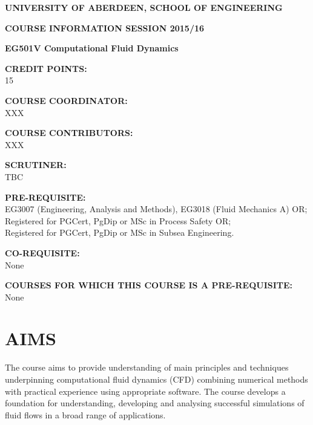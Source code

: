 \documentclass[12pts,a4paper,amsmath,amssymb,floatfix]{article}%
\begin{document}
\begin{center}
{\large {\bf UNIVERSITY OF ABERDEEN, SCHOOL OF ENGINEERING}}
\medskip

{\large {\bf COURSE INFORMATION SESSION 2015/16}}
\bigskip 

{\Large {\bf EG501V Computational Fluid Dynamics}}
\end{center}

\bigskip
\begin{flushleft}

{\large {\bf CREDIT POINTS:}}\\
\hspace{0.8cm} 15
\medskip

{\large {\bf COURSE COORDINATOR: }}\\
\hspace{0.8cm} XXX %
\medskip 

{\large {\bf COURSE CONTRIBUTORS:}}\\
\hspace{0.8cm} XXX %
\medskip

{\large {\bf SCRUTINER:}}\\
\hspace{0.8cm} TBC
\medskip  

{\large {\bf PRE-REQUISITE:}}\\
\hspace{0.8cm}EG3007 (Engineering, Analysis and Methods), EG3018 (Fluid Mechanics A) OR;\\
\hspace{0.8cm}Registered for PGCert, PgDip or MSc in Process Safety OR;\\
\hspace{0.8cm}Registered for PGCert, PgDip or MSc in Subsea Engineering.\\
\medskip

{\large {\bf CO-REQUISITE:}}\\
\hspace{0.8cm}None
\medskip 

{\large {\bf COURSES FOR WHICH THIS COURSE IS A PRE-REQUISITE:}}\\
\hspace{0.8cm}None
\end{flushleft}

\clearpage


\section{AIMS}
The course aims to provide understanding of main principles and techniques underpinning computational fluid dynamics (CFD) combining numerical methods with practical experience using appropriate software. The course develops a foundation for understanding, developing and analysing successful simulations of fluid flows in a broad range of applications.
\end{document}
